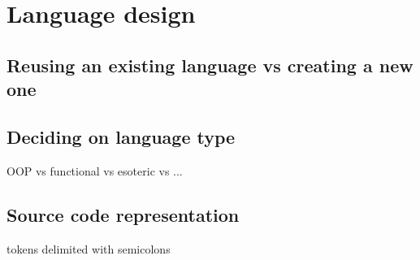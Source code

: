 
\chapter{Language design}

\section{Reusing an existing language vs creating a new one}

\section{Deciding on language type}
OOP vs functional vs esoteric vs ...

\section{Source code representation}
tokens delimited with semicolons